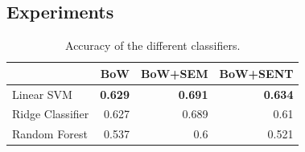 

\subsection{Experiments}

\begin{table}[]
\centering
\begin{tabular}{l r r r}
\hline
& BoW & BoW+SEM & BoW+SENT \\ 
\hline
Linear SVM       & \textbf{0.629}           & \textbf{0.691}               & \textbf{0.634}                \\
Ridge Classifier & 0.627                    & 0.689                        & 0.61                          \\
Random Forest    & 0.537                    & 0.6                          & 0.521                         \\ \hline
\end{tabular}
\caption{Accuracy of the different classifiers.}
\label{tbl:similarity:classifiers}
\end{table}

